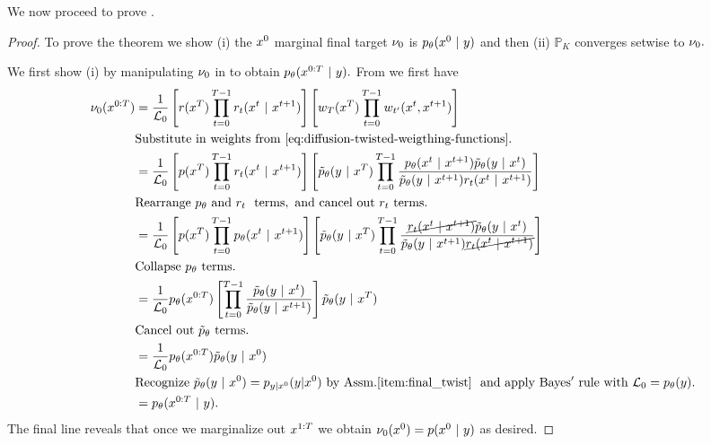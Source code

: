 We now proceed to prove .
\begin{proof}
To prove the theorem we show
(i) the $x^{0}$ marginal final target $\nu_0$ is $p_{\theta}(x^{0} ~\vert~ y)$ and then
(ii) $\mathbb{P}_K$ converges setwise to $\nu_0.$

We first show (i) by manipulating $\nu_0$ in  to obtain $p_{\theta}(x^{0:T} ~\vert~ y).$
From  we first have
\begin{align}
\begin{split}
   \target_0(\dt{x}{0:T}) &= \frac{1}{\mathcal{L}_0} 
        \left[ \proposal(\dt{x}{T})  \prod_{t=0}^{T-1} \proposal_{t}(\dt{x}{t}\mid  \dt{x}{t+1})  \right] 
        \left[ \weight_T(\dt{x}{T})
        \prod_{t=0}^{T-1} \weight_{t^\prime}(\dt{x}{t}, \dt{x}{t+1}) \right]   \\
    &\mathrm{Substitute\ in\ weights\ from\ \cref{eq:diffusion-twisted-weigthing-functions}.} \\
    &= \frac{1}{\mathcal{L}_0} 
        \left[ p(\dt{x}{T}) \prod_{t=0}^{T-1} r_t (\xt \mid \xtpo)
        \right] 
        \left[ \pTwist(y\mid \dt{x}{T})
        \prod_{t=0}^{T-1} 
        \frac{\pmodel(\xt \mid \xtpo)\pTwist(y\mid \xt)}{\pTwist(y \mid \xtpo)r_t(\xt \mid \xtpo)}
        \right] \\
    &\mathrm{Rearrange\ }\pmodel\mathrm{\ and \ } r_t\ \mathrm{\ terms, \ and\ cancel\ out\ }r_t \mathrm{\ terms.} \\
    &= \frac{1}{\mathcal{L}_0} 
        \left[ p(\dt{x}{T}) \prod_{t=0}^{T-1} \pmodel(\xt \mid \xtpo)
        \right] 
        \left[ \pTwist(y\mid \dt{x}{T})
        \prod_{t =0}^{T-1} 
        \frac{\cancel{r_t(\xt \mid \xtpo)}\pTwist(y\mid \xt)}{\pTwist(y \mid \xtpo)\cancel{r_t(\xt \mid \xtpo)}}
        \right] \\
    &\mathrm{Collapse\ }\pmodel\mathrm{\ terms.}\\ %
    &= \frac{1}{\mathcal{L}_0} 
        \pmodel(\dt{x}{0:T})
        \left[ 
        \prod_{t=0}^{T-1} 
        \frac{\pTwist(y\mid \xt)}{\pTwist(y \mid \xtpo)}\right]\pTwist(y \mid \dt{x}{T})\\
    &\mathrm{Cancel \ out \ } \pTwist \mathrm{\ terms.}\\
    &= \frac{1}{\mathcal{L}_0} 
        \pmodel(\dt{x}{0:T}) \pTwist (y \mid \xzero) \\ 
    &\mathrm{Recognize\ }\pTwist(y\mid \dt{x}{0})=\plikelihood{y}{\xzero}\mathrm{\ by \ Assm. \ref{item:final_twist}\ \ and\  apply\  Bayes'\  rule\  with\  }\mathcal{L}_0=\pmodel(y). \\
    &= \pmodel(\dt{x}{0:T}\mid y).
\end{split}
\end{align}
The final line reveals that once we marginalize out $x^{1:T}$
we obtain $\nu_0(x^{0})=p(x^{0} ~\vert~ y)$ as desired.


\end{proof}
